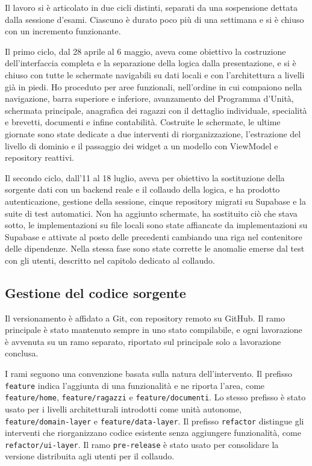 \documentclass[11pt]{article}
\numberwithin{figure}{section}
\begin{document}
Il lavoro si è articolato in due cicli distinti, separati da una sospensione dettata dalla sessione d'esami. Ciascuno è durato poco più di una settimana e si è chiuso con un incremento funzionante.

Il primo ciclo, dal 28 aprile al 6 maggio, aveva come obiettivo la costruzione dell'interfaccia completa e la separazione della logica dalla presentazione, e si è chiuso con tutte le schermate navigabili su dati locali e con l'architettura a livelli già in piedi. Ho proceduto per aree funzionali, nell'ordine in cui compaiono nella navigazione, barra superiore e inferiore, avanzamento del Programma d'Unità, schermata principale, anagrafica dei ragazzi con il dettaglio individuale, specialità e brevetti, documenti e infine contabilità. Costruite le schermate, le ultime giornate sono state dedicate a due interventi di riorganizzazione, l'estrazione del livello di dominio e il passaggio dei widget a un modello con ViewModel e repository reattivi.

Il secondo ciclo, dall'11 al 18 luglio, aveva per obiettivo la sostituzione della sorgente dati con un backend reale e il collaudo della logica, e ha prodotto autenticazione, gestione della sessione, cinque repository migrati su Supabase e la suite di test automatici. Non ha aggiunto schermate, ha sostituito ciò che stava sotto, le implementazioni su file locali sono state affiancate da implementazioni su Supabase e attivate al posto delle precedenti cambiando una riga nel contenitore delle dipendenze. Nella stessa fase sono state corrette le anomalie emerse dal test con gli utenti, descritto nel capitolo dedicato al collaudo.

\subsection{Gestione del codice sorgente}

Il versionamento è affidato a Git, con repository remoto su GitHub. Il ramo principale è stato mantenuto sempre in uno stato compilabile, e ogni lavorazione è avvenuta su un ramo separato, riportato sul principale solo a lavorazione conclusa.

I rami seguono una convenzione basata sulla natura dell'intervento. Il prefisso \texttt{feature} indica l'aggiunta di una funzionalità e ne riporta l'area, come \texttt{feature/home}, \texttt{feature/ragazzi} e \texttt{feature/documenti}. Lo stesso prefisso è stato usato per i livelli architetturali introdotti come unità autonome, \texttt{feature/domain-layer} e \texttt{feature/data-layer}. Il prefisso \texttt{refactor} distingue gli interventi che riorganizzano codice esistente senza aggiungere funzionalità, come \texttt{refactor/ui-layer}. Il ramo \texttt{pre-release} è stato usato per consolidare la versione distribuita agli utenti per il collaudo.
\end{document}
